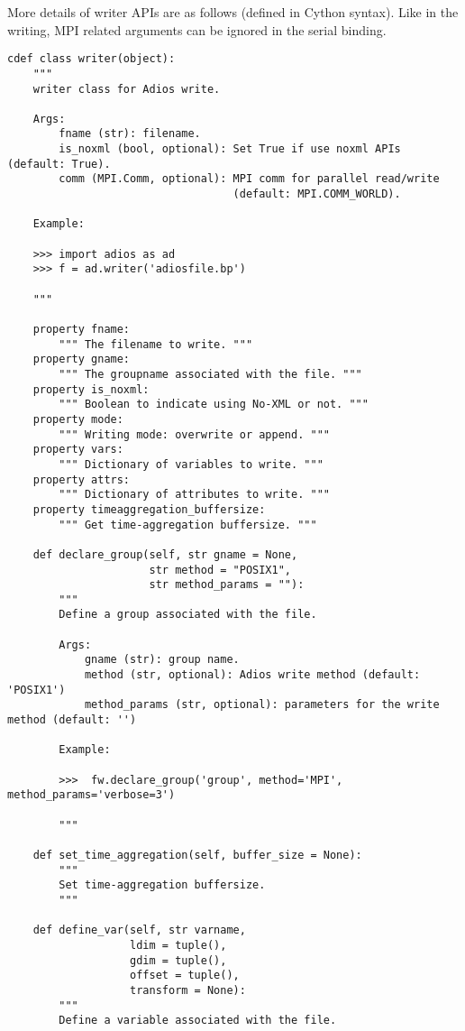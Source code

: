 More details of writer APIs are as follows (defined in Cython syntax). Like in the writing, MPI related arguments can be ignored in the serial binding.

\begin{lstlisting}[language=cython,caption={Writer functions},label={},]
cdef class writer(object):
    """
    writer class for Adios write.

    Args:
        fname (str): filename.
        is_noxml (bool, optional): Set True if use noxml APIs (default: True).
        comm (MPI.Comm, optional): MPI comm for parallel read/write 
                                   (default: MPI.COMM_WORLD).

    Example:

    >>> import adios as ad
    >>> f = ad.writer('adiosfile.bp')

    """

    property fname:
        """ The filename to write. """
    property gname:
        """ The groupname associated with the file. """
    property is_noxml:
        """ Boolean to indicate using No-XML or not. """
    property mode:
        """ Writing mode: overwrite or append. """
    property vars:
        """ Dictionary of variables to write. """
    property attrs:
        """ Dictionary of attributes to write. """
    property timeaggregation_buffersize:
        """ Get time-aggregation buffersize. """

    def declare_group(self, str gname = None,
                      str method = "POSIX1",
                      str method_params = ""):
        """
        Define a group associated with the file.

        Args:
            gname (str): group name.
            method (str, optional): Adios write method (default: 'POSIX1')
            method_params (str, optional): parameters for the write method (default: '')

        Example:

        >>>  fw.declare_group('group', method='MPI', method_params='verbose=3')

        """

    def set_time_aggregation(self, buffer_size = None):
        """
        Set time-aggregation buffersize.
        """

    def define_var(self, str varname,
                   ldim = tuple(),
                   gdim = tuple(),
                   offset = tuple(),
                   transform = None):
        """
        Define a variable associated with the file.


\end{lstlisting}
